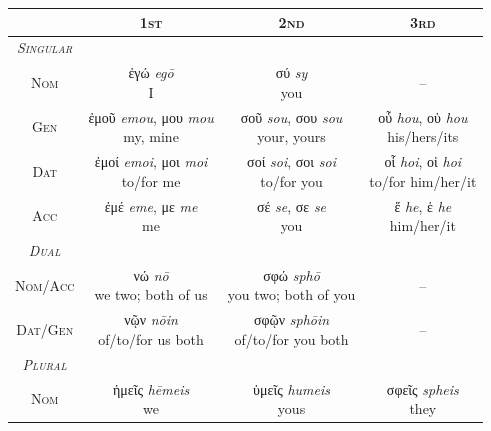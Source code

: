\documentclass[10pt,a4paper,notitlepage]{article}
\newcommand{\tsc}[1]{\textsc{#1}}
\newcommand*{\grc}[1]{\fontspec{Inter}#1\rmfamily}
\newcommand{\trc}[1]{\textit{\fontspec{Tinos}#1}}
\begin{document}
     \begin{table}[H]
         \begin{tabular}{c|ccc}
             & \tsc{1st} & \tsc{2nd} & \tsc{3rd} \\
             \hline
             \emph{\tsc{Singular}} \\
             \tsc{Nom} & \makecell{\grc{ἐγώ} \trc{egō} \\ \small I} & \makecell{\grc{σύ} \trc{sy} \\ \small you} & -- \\
             \tsc{Gen} & \makecell{\grc{ἐμοῦ} \trc{emou}, \grc{μου} \trc{mou} \\ \small my, mine} & \makecell{\grc{σοῦ} \trc{sou}, \grc{σου} \trc{sou} \\ \small your, yours}  & \makecell{\grc{οὗ} \trc{hou}, \grc{οὑ} \trc{hou} \\ \small his/hers/its} \\
             \tsc{Dat} & \makecell{\grc{ἐμοί} \trc{emoi}, \grc{μοι} \trc{moi} \\ \small to/for me} & \makecell{\grc{σοί} \trc{soi}, \grc{σοι} \trc{soi} \\ \small to/for you}  & \makecell{\grc{οἷ} \trc{hoi}, \grc{οἱ} \trc{hoi} \\ \small to/for him/her/it} \\
             \tsc{Acc} & \makecell{\grc{ἐμέ} \trc{eme}, \grc{με} \trc{me} \\ \small me} & \makecell{\grc{σέ} \trc{se}, \grc{σε} \trc{se} \\ \small you}  & \makecell{\grc{ἕ} \trc{he}, \grc{ἑ} \trc{he} \\ \small him/her/it} \\
             \hline
             \emph{\tsc{Dual}} \\
             \tsc{Nom/Acc} & \makecell{\grc{νώ} \trc{nō} \\ \small we two; both of us} & \makecell{\grc{σφώ} \trc{sphō} \\ \small you two; both of you} & -- \\
             \tsc{Dat/Gen} & \makecell{\grc{νῷν} \trc{nōin} \\ \small of/to/for us both} & \makecell{\grc{σφῷν} \trc{sphōin} \\ \small of/to/for you both} & --\\
             \hline
             \emph{\tsc{Plural}} \\
             \tsc{Nom} & \makecell{\grc{ἡμεῖς} \trc{hēmeis} \\ \small we} & \makecell{\grc{ὑμεῖς} \trc{humeis} \\ \small yous}  & \makecell{\grc{σφεῖς} \trc{spheis} \\ \small they} \\

\end{tabular}
\end{table}
\end{document}
